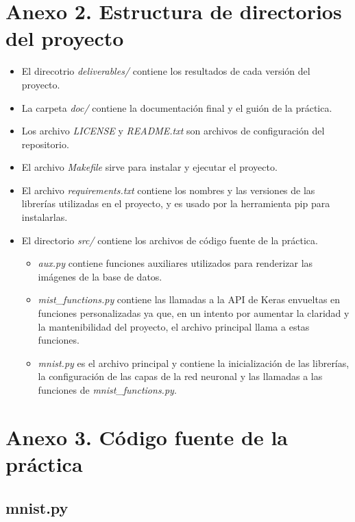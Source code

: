 \newpage
\section{Anexo 2. Estructura de directorios del proyecto}

\bigskip

\begin{itemize}
  \item El direcotrio \textit{deliverables/} contiene los resultados de cada versión del proyecto.
  \item La carpeta \textit{doc/} contiene la documentación final y el guión de la práctica.
  \item Los archivo \textit{LICENSE} y \textit{README.txt} son archivos de configuración del repositorio.
  \item El archivo \textit{Makefile} sirve para instalar y ejecutar el proyecto.
  \item El archivo \textit{requirements.txt} contiene los nombres y las versiones de las librerías utilizadas en el proyecto, y es usado por la herramienta pip para instalarlas.
  \item El directorio \textit{src/} contiene los archivos de código fuente de la práctica.
  \begin{itemize}
    \item \textit{aux.py} contiene funciones auxiliares utilizados para renderizar las imágenes de la base de datos.
    \item \textit{mist\_functions.py} contiene las llamadas a la API de Keras envueltas en funciones personalizadas ya que, en un intento por aumentar la claridad y la mantenibilidad del proyecto, el archivo principal llama a estas funciones.
    \item \textit{mnist.py} es el archivo principal y contiene la inicialización de las librerías, la configuración de las capas de la red neuronal y las llamadas a las funciones de \textit{mnist\_functions.py}.
  \end{itemize}
\end{itemize}


\newpage
\section{Anexo 3. Código fuente de la práctica}

\subsection{mnist.py}

